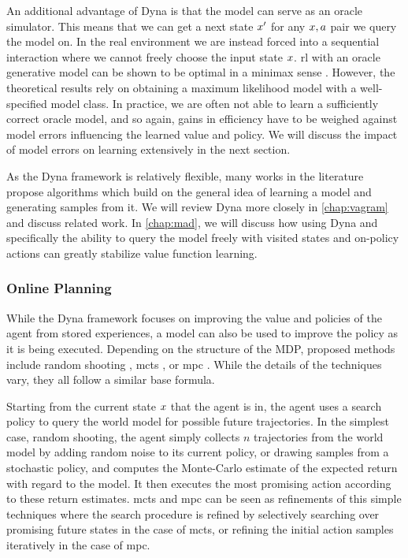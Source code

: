 An additional advantage of Dyna is that the model can serve as an oracle simulator.
This means that we can get a next state $x'$ for any $x,a$ pair we query the model on.
In the real environment we are instead forced into a sequential interaction where we cannot freely choose the input state $x$.
\ac{rl} with an oracle generative model can be shown to be optimal in a minimax sense \parencite{agarwal2020model}.
However, the theoretical results rely on obtaining a maximum likelihood model with a well-specified model class.
In practice, we are often not able to learn a sufficiently correct oracle model, and so again, gains in efficiency have to be weighed against model errors influencing the learned value and policy.
We will discuss the impact of model errors on learning extensively in the next section.

As the Dyna framework is relatively flexible, many works in the literature propose algorithms which build on the general idea of learning a model and generating samples from it.
We will review Dyna more closely in \autoref{chap:vagram} and discuss related work.
In \autoref{chap:mad}, we will discuss how using Dyna and specifically the ability to query the model freely with visited states and on-policy actions can greatly stabilize value function learning.

\subsubsection{Online Planning}

While the Dyna framework focuses on improving the value and policies of the agent from stored experiences, a model can also be used to improve the policy as it is being executed.
Depending on the structure of the MDP, proposed methods include random shooting \parencite{pets}, \ac{mcts} \parencite{silver2016mastering,schrittwieser2020mastering}, or \ac{mpc} \parencite{hansen2022temporal,hansen2024tdmpc}.
While the details of the techniques vary, they all follow a similar base formula.

Starting from the current state $x$ that the agent is in, the agent uses a search policy to query the world model for possible future trajectories.
In the simplest case, random shooting, the agent simply collects $n$ trajectories from the world model by adding random noise to its current policy, or drawing samples from a stochastic policy, and computes the Monte-Carlo estimate of the expected return with regard to the model.
It then executes the most promising action according to these return estimates.
\ac{mcts} and \ac{mpc} can be seen as refinements of this simple techniques where the search procedure is refined by selectively searching over promising future states in the case of \ac{mcts}, or refining the initial action samples iteratively in the case of \ac{mpc}.

